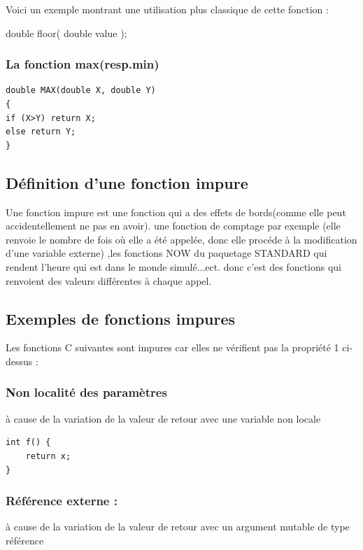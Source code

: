 \documentclass[12pt,titlepage]{article}
\begin{document}
Voici un exemple montrant une utilisation plus classique de cette fonction :

double      floor( double value );


\subsubsection{La fonction max(resp.min)}

\begin{lstlisting}
double MAX(double X, double Y)
{
if (X>Y) return X;
else return Y;
}
\end{lstlisting}

\subsection{Définition d’une fonction impure}

Une fonction impure est une fonction qui a des effets de bords(comme elle peut accidentellement ne pas en avoir).
une fonction de comptage par exemple (elle renvoie le nombre de fois où elle a été appelée, donc elle procéde à la modification d’une variable externe) ,les fonctions NOW du paquetage STANDARD qui rendent l’heure qui est dans le monde simulé...ect. donc c'est des fonctions qui renvoient des valeurs différentes à chaque appel.\cite{fctimpures}
\subsection{Exemples de fonctions impures }
Les fonctions C suivantes sont impures car elles ne vérifient pas la propriété 1 ci-dessus :

\subsubsection{Non localité des paramètres}

à cause de la variation de la valeur de retour avec une variable non locale

\begin{lstlisting}
int f() {
    return x;
}
\end{lstlisting}

\subsubsection{Référence externe :}

à cause de la variation de la valeur de retour avec un argument mutable de type référence
\end{document}

